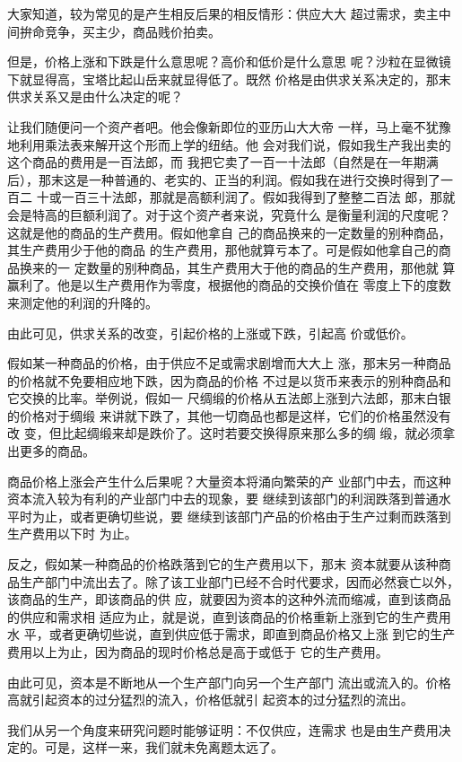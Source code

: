 \documentclass[a4paper,twoside,12pt,AutoFakeBold]{ctexart}
\begin{document}
大家知道，较为常见的是产生相反后果的相反情形：供应大大
超过需求，卖主中间拚命竞争，买主少，商品贱价拍卖。

但是，价格上涨和下跌是什么意思呢？高价和低价是什么意思
呢？沙粒在显微镜下就显得高，宝塔比起山岳来就显得低了。既然
价格是由供求关系决定的，那末供求关系又是由什么决定的呢？

让我们随便问一个资产者吧。他会像新即位的亚历山大大帝
一样，马上毫不犹豫地利用乘法表来解开这个形而上学的纽结。他
会对我们说，假如我生产我出卖的这个商品的费用是一百法郎，而
我把它卖了一百一十法郎（自然是在一年期满后），那末这是一种普通的、老实的、正当的利润。假如我在进行交换时得到了一百二
十或一百三十法郎，那就是高额利润了。假如我得到了整整二百法
郎，那就会是特高的巨额利润了。对于这个资产者来说，究竟什么
是衡量利润的尺度呢？这就是他的商品的生产费用。假如他拿自
己的商品换来的一定数量的别种商品，其生产费用少于他的商品
的生产费用，那他就算亏本了。可是假如他拿自己的商品换来的一
定数量的别种商品，其生产费用大于他的商品的生产费用，那他就
算赢利了。他是以生产费用作为零度，根据他的商品的交换价值在
零度上下的度数来测定他的利润的升降的。

由此可见，供求关系的改变，引起价格的上涨或下跌，引起高
价或低价。

假如某一种商品的价格，由于供应不足或需求剧增而大大上
涨，那末另一种商品的价格就不免要相应地下跌，因为商品的价格
不过是以货币来表示的别种商品和它交换的比率。举例说，假如一
尺绸缎的价格从五法郎上涨到六法郎，那末白银的价格对于绸缎
来讲就下跌了，其他一切商品也都是这样，它们的价格虽然没有改
变，但比起绸缎来却是跌价了。这时若要交换得原来那么多的绸
缎，就必须拿出更多的商品。

商品价格上涨会产生什么后果呢？大量资本将涌向繁荣的产
业部门中去，而这种资本流入较为有利的产业部门中去的现象，要
继续到该部门的利润跌落到普通水平时为止，或者更确切些说，要
继续到该部门产品的价格由于生产过剩而跌落到生产费用以下时
为止。

反之，假如某一种商品的价格跌落到它的生产费用以下，那末
资本就要从该种商品生产部门中流出去了。除了该工业部门已经不合时代要求，因而必然衰亡以外，该商品的生产，即该商品的供
应，就要因为资本的这种外流而缩减，直到该商品的供应和需求相
适应为止，就是说，直到该商品的价格重新上涨到它的生产费用水
平，或者更确切些说，直到供应低于需求，即直到商品价格又上涨
到它的生产费用以上为止，因为商品的现时价格总是高于或低于
它的生产费用。

由此可见，资本是不断地从一个生产部门向另一个生产部门
流出或流入的。价格高就引起资本的过分猛烈的流入，价格低就引
起资本的过分猛烈的流出。

我们从另一个角度来研究问题时能够证明：不仅供应，连需求
也是由生产费用决定的。可是，这样一来，我们就未免离题太远了。
\end{document}
